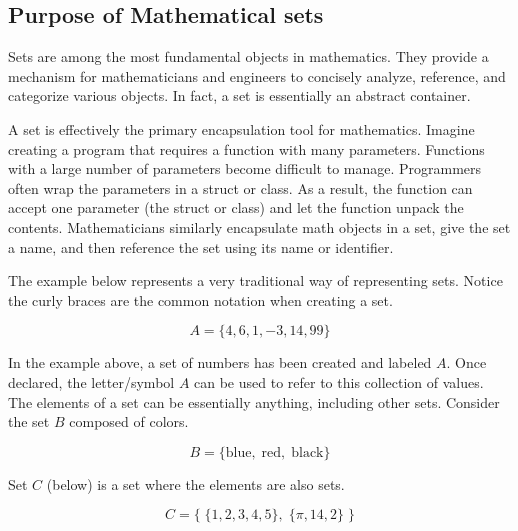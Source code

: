 \subsection{Purpose of Mathematical sets}

Sets are among the most fundamental objects in mathematics. They provide a mechanism for mathematicians and engineers to concisely analyze, reference, and categorize various objects. In fact, a set is essentially an abstract container.

A set is effectively the primary encapsulation tool for mathematics. Imagine creating a program that requires a function with many parameters. Functions with a large number of parameters become difficult to manage. Programmers often wrap the parameters in a struct or class. As a result, the function can accept one parameter (the struct or class) and let the function unpack the contents. Mathematicians similarly encapsulate math objects in a set, give the set a name, and then reference the set using its name or identifier.

The example below represents a very traditional way of representing sets. Notice the curly braces are the common notation when creating a set.

\[
 A = \{4, 6, 1, -3, 14, 99\}
\]

In the example above, a set of numbers has been created and labeled $A$. Once declared, the letter/symbol $A$ can be used to refer to this collection of values. The elements of a set can be essentially anything, including other sets. Consider the set $B$ composed of colors.

\[
 B = \{\text{blue},\; \text{red},\; \text{black}\}
\]

Set $C$ (below) is a set where the elements are also sets.

\[
 C = \{\; \{1,2,3,4,5\},\; \{\pi, 14, 2\}\;\}
\]

